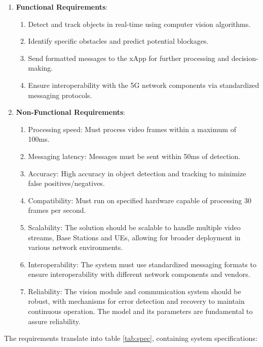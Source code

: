 \begin{enumerate}
    \item \textbf{Functional Requirements}:
    \begin{enumerate}
        \item Detect and track objects in real-time using computer vision algorithms.
        \item Identify specific obstacles and predict potential blockages.
        \item Send formatted messages to the xApp for further processing and decision-making.
        \item Ensure interoperability with the 5G network components via standardized messaging protocols.
    \end{enumerate}
    \item \textbf{Non-Functional Requirements}:
    \begin{enumerate}
        \item Processing speed: Must process video frames within a maximum of 100ms.
        \item Messaging latency: Messages must be sent within 50ms of detection.
        \item Accuracy: High accuracy in object detection and tracking to minimize false positives/negatives.
        \item Compatibility: Must run on specified hardware capable of processing 30 frames per second.
        \item Scalability: The solution should be scalable to handle multiple video streams, Base Stations and UEs, allowing for broader deployment in various network environments.
        \item Interoperability: The system must use standardized messaging formats to ensure interoperability with different network components and vendors.
        \item Reliability: The vision module and communication system should be robust, with mechanisms for error detection and recovery to maintain continuous operation. The model and its parameters are fundamental to assure reliability.
    \end{enumerate}
\end{enumerate}


The requirements translate into table \ref{tab:spec}, containing system specifications:

